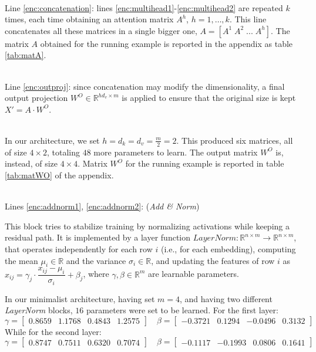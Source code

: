 \documentclass[algorithms,article,submit,pdftex,moreauthors]{Definitions/mdpi}
\begin{document}
~\\Line \ref{enc:concatenation}: lines \ref{enc:multihead1}-\ref{enc:multihead2} are repeated $k$ times, each time obtaining an attention matrix $A^h$, $h=1,\dots,k$. This line concatenates all these matrices in a single bigger one, $A = [A^1\;A^2\;...\;A^h]$. The matrix $A$ obtained for the running example is reported in the appendix as table \ref{tab:matA}.

~\\Line \ref{enc:outproj}: since concatenation may modify the dimensionality, a final output projection $W^O \in \mathbb{R}^{hd_v \times m}$ is applied to ensure that the original size is kept $X' = A \cdot W^O$. 

~\\In our architecture, we set $h = d_k = d_v = \frac{m}{2} = 2$. This produced six matrices, all of size $4 \times 2$, totaling $48$ more parameters to learn. The output matrix $W^O$ is, instead, of size $4 \times 4$. Matrix $W^O$ for the running example is reported in table \ref{tab:matWO} of the appendix.

~\\Lines \ref{enc:addnorm1}, \ref{enc:addnorm2}: (\textit{Add \& Norm})

This block tries to stabilize training by normalizing activations while keeping a residual path. It is implemented by a layer function $LayerNorm : \mathbb{R}^{n \times m} \to \mathbb{R}^{n \times m}$, that operates independently for each row $i$ (i.e., for each embedding), computing the mean $\mu_i \in \mathbb{R}$ and the variance $\sigma_i \in \mathbb{R}$, and updating the features of row $i$ as $ x_{ij} = \gamma_j\cdot\dfrac{x_{ij} - \mu_i}{\sigma_i} + \beta_j$, 
where $\gamma,\beta \in \mathbb{R}^m$ are learnable parameters.

In our minimalist architecture, having set $m = 4$, and having two different \textit{LayerNorm} blocks, $16$ parameters were set to be learned. For the first layer:
$$
    \gamma =    \begin{bmatrix}
                    0.8659 & 1.1768 & 0.4843 & 1.2575
                \end{bmatrix} \quad
    \beta =     \begin{bmatrix}
                -0.3721 & 0.1294 & -0.0496 & 0.3132
                \end{bmatrix}
$$
While for the second layer:
$$
    \gamma =    \begin{bmatrix}
                    0.8747 & 0.7511 & 0.6320 & 0.7074
                \end{bmatrix} \quad
    \beta =     \begin{bmatrix}
                    -0.1117 & -0.1993 & 0.0806 & 0.1641
                \end{bmatrix}
$$
\end{document}

